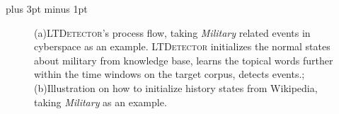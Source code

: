 \documentclass[runningheads,a4paper]{llncs}
\begin{document}
\intextsep=5pt plus 3pt minus 1pt
\begin{figure}[h]
	\setlength{\abovecaptionskip}{0.cm}
	\setlength{\belowcaptionskip}{0.cm}
	\centering
    \label{fig:subfig} %
        \caption{(a)\textsc{LTDetector}'s process flow, taking \textit{Military} related events in cyberspace as an example. \textsc{LTDetector} initializes the normal states about military from knowledge base, learns the topical words further within the time windows on the target corpus, detects events.;(b)Illustration on how to initialize history states from Wikipedia, taking \textit{Military} as an example.}
\end{figure}


\end{document}
